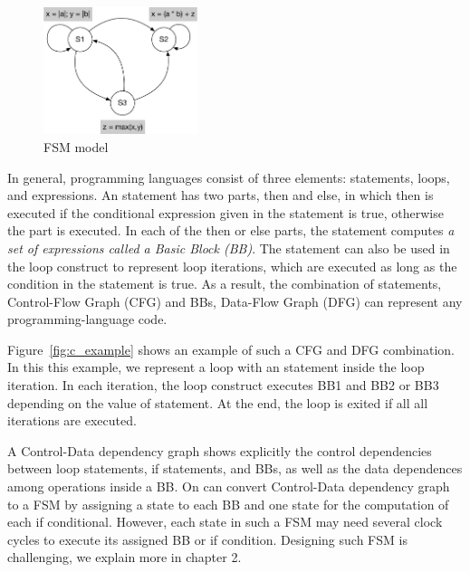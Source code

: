 \begin{figure}[h]
    \centering
    \includegraphics[width=0.4\textwidth]{figures/Introduction/FSM.pdf}
    \caption{FSM model}
    \label{fig:fsm_model}
\end{figure}


In general, programming languages consist of three elements:  statements, loops, and expressions.
An  statement has two parts, then and else, in which then is executed if the conditional expression given in the  statement is true, otherwise the  part is executed.
In each of the then or else parts, the  statement computes \emph{a set of expressions called a Basic Block (BB)}.
The  statement can also be used in the loop construct to represent loop iterations, which are executed as long as the condition in the  statement is true.
As a result, the combination of  statements, Control-Flow Graph (CFG) and BBs, Data-Flow Graph (DFG) can represent any programming-language code.
 
Figure~\ref{fig:c_example} shows an example of such a CFG and DFG combination. 
In this this example, we represent a loop with an  statement inside the loop iteration.
In each iteration, the loop construct executes BB1 and BB2 or BB3 depending on the value of  statement. At the end, the loop is exited if all all iterations are executed.

A Control-Data dependency graph shows explicitly the control dependencies between loop statements, if statements, and BBs, as well as the data dependences among operations inside a BB.
On can convert Control-Data dependency graph to a FSM by assigning a state to each BB and one state for the computation of each if conditional.
However, each state in such a FSM may need several clock cycles to execute its assigned BB or if condition.
Designing such FSM is challenging, we explain more in chapter 2.


